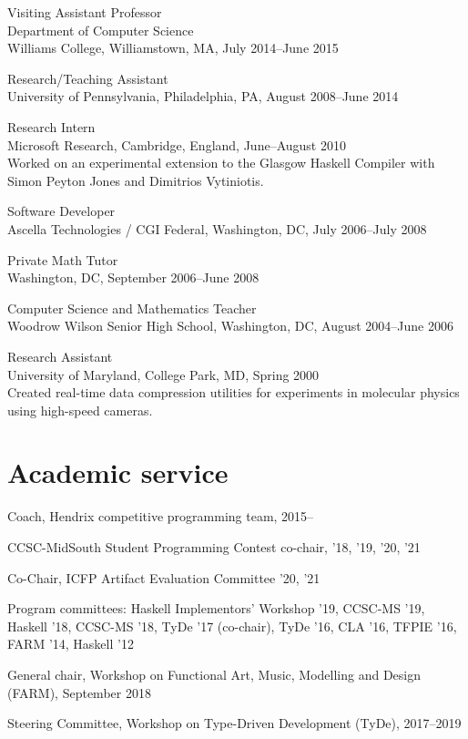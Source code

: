 \documentclass[12pt]{article}
\newcommand{\cvitem}{\par\hangpara{2em}{1}}
\begin{document}
\cvitem
Visiting Assistant Professor \\
Department of Computer Science \\
Williams College, Williamstown, MA, July 2014--June 2015

\cvitem
Research/Teaching Assistant \\
University of Pennsylvania, Philadelphia, PA, August 2008--June 2014

\cvitem
Research Intern \\
Microsoft Research, Cambridge, England, June--August 2010 \\
Worked on an experimental extension to the Glasgow Haskell Compiler with
Simon Peyton Jones and Dimitrios Vytiniotis.

\cvitem
Software Developer \\
Ascella Technologies / CGI Federal, Washington,
DC, July 2006--July 2008

\cvitem
Private Math Tutor \\
Washington, DC, September 2006--June 2008

\cvitem
Computer Science and Mathematics Teacher \\
Woodrow Wilson Senior High School, Washington, DC, August 2004--June 2006

\cvitem
Research Assistant \\
University of Maryland, College Park, MD, Spring 2000 \\
Created real-time data compression utilities for experiments in
molecular physics using high-speed cameras.

\section*{Academic service}

\cvitem Coach, Hendrix competitive programming team, 2015--

\cvitem CCSC-MidSouth Student Programming Contest co-chair, '18, '19, '20, '21

\cvitem Co-Chair, ICFP Artifact Evaluation Committee '20, '21

\cvitem Program committees: Haskell Implementors' Workshop '19,
CCSC-MS '19, Haskell '18, CCSC-MS '18, TyDe '17 (co-chair), TyDe '16,
CLA '16, TFPIE '16, FARM '14, Haskell '12

\cvitem General chair, Workshop on Functional Art, Music, Modelling
and Design (FARM), September 2018

\cvitem Steering Committee, Workshop on Type-Driven Development
(TyDe), 2017--2019
\end{document}
